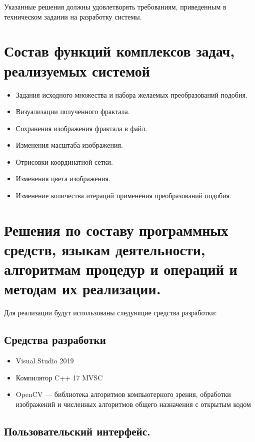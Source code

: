 \documentclass[a4paper,12pt,preview]{report} %
\begin{document}
	Указанные решения должны удовлетворять требованиям, приведенным в техническом задании на разработку системы.
	
	\section{Состав функций комплексов задач, реализуемых системой}
	
	
	\begin{itemize}
		\item Задания исходного множества и набора желаемых преобразований подобия.
		\item Визуализации полученного фрактала.
		\item Сохранения изображения фрактала в файл.
		\item Изменения масштаба изображения.
		\item Отрисовки координатной сетки.
		\item Изменения цвета изображения.
		\item Изменение количества итераций применения преобразований подобия.
	\end{itemize}
	
	\section{Решения по составу программных средств, языкам деятельности, алгоритмам процедур и операций и методам их реализации.}
	
	Для реализации будут использованы следующие средства разработки:
	
	\subsection{Средства разработки}
		
		\begin{itemize}
			\item Visual Studio 2019 
			
			\item Компилятор C++ 17 MVSC
			
			\item OpenCV — библиотека алгоритмов компьютерного зрения, обработки изображений и численных алгоритмов общего назначения с открытым кодом
			
		\end{itemize}
		
	\subsection{Пользовательский интерфейс.}
		
\end{document}
